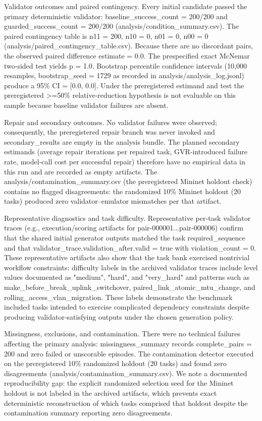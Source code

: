 \documentclass[conference]{IEEEtran}
\begin{document}
Validator outcomes and paired contingency. Every initial candidate passed the primary deterministic validator: baseline\_success\_count = 200/200 and guarded\_success\_count = 200/200 (analysis/condition\_summary.csv). The paired contingency table is n11 = 200, n10 = 0, n01 = 0, n00 = 0 (analysis/paired\_contingency\_table.csv). Because there are no discordant pairs, the observed paired difference estimate = 0.0. The prespecified exact McNemar two‑sided test yields p = 1.0. Bootstrap percentile confidence intervals (10,000 resamples, bootstrap\_seed = 1729 as recorded in analysis/analysis\_log.jsonl) produce a 95\% CI = [0.0, 0.0]. Under the preregistered estimand and test the preregistered >=50\% relative‑reduction hypothesis is not evaluable on this sample because baseline validator failures are absent.

Repair and secondary outcomes. No validator failures were observed; consequently, the preregistered repair branch was never invoked and secondary\_results are empty in the analysis bundle. The planned secondary estimands (average repair iterations per repaired task, GVR‑introduced failure rate, model‑call cost per successful repair) therefore have no empirical data in this run and are recorded as empty artifacts. The analysis/contamination\_summary.csv (the preregistered Mininet holdout check) contains no flagged disagreements: the randomized 10\% Mininet holdout (20 tasks) produced zero validator--emulator mismatches per that artifact.

Representative diagnostics and task difficulty. Representative per‑task validator traces (e.g., execution/scoring artifacts for pair‑000001...pair‑000006) confirm that the shared initial generator outputs matched the task required\_sequence and that validator\_trace.validation\_after.valid = true with violation\_count = 0. These representative artifacts also show that the task bank exercised nontrivial workflow constraints: difficulty labels in the archived validator traces include level values documented as "medium", "hard", and "very\_hard" and patterns such as make\_before\_break\_uplink\_switchover, paired\_link\_atomic\_mtu\_change, and rolling\_access\_vlan\_migration. These labels demonstrate the benchmark included tasks intended to exercise complicated dependency constraints despite producing validator‑satisfying outputs under the chosen generation policy.

Missingness, exclusions, and contamination. There were no technical failures affecting the primary analysis: missingness\_summary records complete\_pairs = 200 and zero failed or unscorable episodes. The contamination detector executed on the preregistered 10\% randomized holdout (20 tasks) and found zero disagreements (analysis/contamination\_summary.csv). We note a documented reproducibility gap: the explicit randomized selection seed for the Mininet holdout is not labeled in the archived artifacts, which prevents exact deterministic reconstruction of which tasks comprised that holdout despite the contamination summary reporting zero disagreements.
\end{document}
